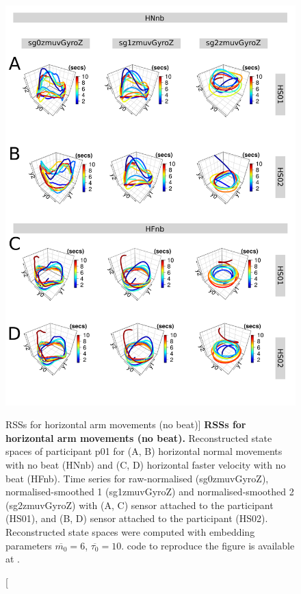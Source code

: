 \begin{figure}
\centering
\includegraphics[height=0.8\textheight]{fig_5_05}
\caption
	[RSSs for horizontal arm movements (no beat)]{
	{\bf RSSs for horizontal arm movements (no beat).}
	Reconstructed state spaces of participant p01 for 
	(A, B) horizontal normal movements with no beat (HNnb) and 
	(C, D) horizontal faster velocity with no beat (HFnb).
	Time series for raw-normalised (sg0zmuvGyroZ), 
	normalised-smoothed 1 (sg1zmuvGyroZ) and 
	normalised-smoothed 2 (sg2zmuvGyroZ) with
	(A, C) sensor attached to the participant (HS01), and
	(B, D) sensor attached to the participant (HS02).	
	Reconstructed state spaces were computed with 
	embedding parameters $\overline{m_0}=6$, $\overline{\tau_0}=10$.
	\R code to reproduce the figure is available at 
	.
        }
     \label{fig:rss_Hnb_w500}
\end{figure}

